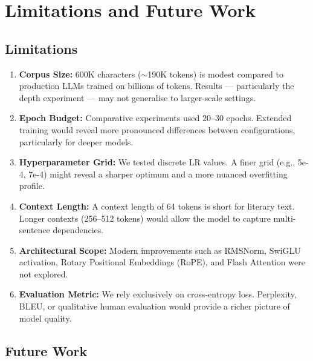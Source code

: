 \documentclass[12pt,a4paper]{article}
\begin{document}
\section{Limitations and Future Work}

\subsection{Limitations}

\begin{enumerate}[leftmargin=2cm]
  \item \textbf{Corpus Size:} 600K characters ($\sim$190K tokens) is modest compared to production LLMs trained on billions of tokens. Results — particularly the depth experiment — may not generalise to larger-scale settings.

  \item \textbf{Epoch Budget:} Comparative experiments used 20–30 epochs. Extended training would reveal more pronounced differences between configurations, particularly for deeper models.

  \item \textbf{Hyperparameter Grid:} We tested discrete LR values. A finer grid (e.g., 5e-4, 7e-4) might reveal a sharper optimum and a more nuanced overfitting profile.

  \item \textbf{Context Length:} A context length of 64 tokens is short for literary text. Longer contexts (256–512 tokens) would allow the model to capture multi-sentence dependencies.

  \item \textbf{Architectural Scope:} Modern improvements such as RMSNorm, SwiGLU activation, Rotary Positional Embeddings (RoPE), and Flash Attention were not explored.

  \item \textbf{Evaluation Metric:} We rely exclusively on cross-entropy loss. Perplexity, BLEU, or qualitative human evaluation would provide a richer picture of model quality.
\end{enumerate}

\subsection{Future Work}
\end{document}
